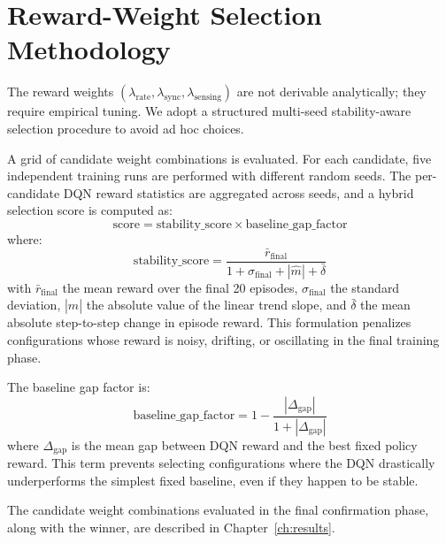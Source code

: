 \section{Reward-Weight Selection Methodology}
\label{sec:sweep}

The reward weights $(\lambda_{\text{rate}}, \lambda_{\text{sync}}, \lambda_{\text{sensing}})$ are not derivable analytically; they require empirical tuning. We adopt a structured multi-seed stability-aware selection procedure to avoid ad hoc choices.

A grid of candidate weight combinations is evaluated. For each candidate, five independent training runs are performed with different random seeds. The per-candidate DQN reward statistics are aggregated across seeds, and a hybrid selection score is computed as:
\begin{equation}
    \text{score} = \text{stability\_score} \times \text{baseline\_gap\_factor}
    \label{eq:hybrid_score}
\end{equation}
where:
\begin{equation}
    \text{stability\_score} = \frac{\bar{r}_{\text{final}}}{\displaystyle 1 + \sigma_{\text{final}} + |\hat{m}| + \bar{\delta}}
    \label{eq:stability_score}
\end{equation}
with $\bar{r}_{\text{final}}$ the mean reward over the final 20 episodes, $\sigma_{\text{final}}$ the standard deviation, $|\hat{m}|$ the absolute value of the linear trend slope, and $\bar{\delta}$ the mean absolute step-to-step change in episode reward. This formulation penalizes configurations whose reward is noisy, drifting, or oscillating in the final training phase.

The baseline gap factor is:
\begin{equation}
    \text{baseline\_gap\_factor} = 1 - \frac{|\Delta_{\text{gap}}|}{1 + |\Delta_{\text{gap}}|}
    \label{eq:gap_factor}
\end{equation}
where $\Delta_{\text{gap}}$ is the mean gap between DQN reward and the best fixed policy reward. This term prevents selecting configurations where the DQN drastically underperforms the simplest fixed baseline, even if they happen to be stable.

The candidate weight combinations evaluated in the final confirmation phase, along with the winner, are described in Chapter~\ref{ch:results}.
